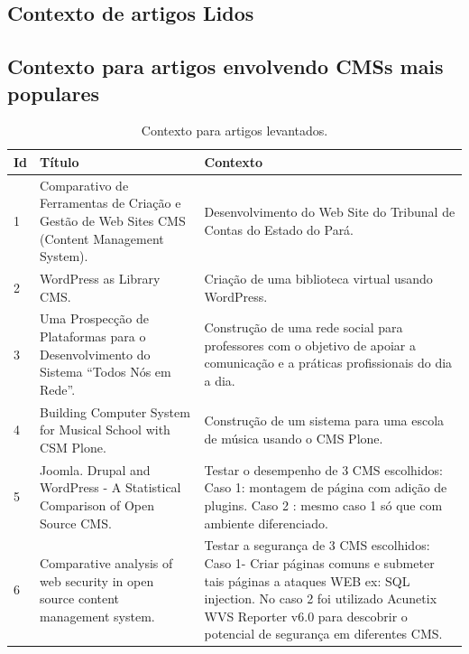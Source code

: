 \begin{apendicesenv}
\begin{landscape}
\section{Contexto de artigos Lidos}

\subsection{Contexto para artigos envolvendo CMSs mais populares}


	\begin{longtable}{|p{10pt}|p{320pt}|p{315pt}|}
 	\caption{Contexto para artigos levantados.} \label{tabela_contexto}\\
 	\hline
 	 {\raggedright \textbf{Id}}
 	 & {\raggedright \textbf{Título}}
 	 & {\raggedright \textbf{Contexto}}\\
 	\hline
 	 {\raggedright 1}
 	 & {\raggedright Comparativo de Ferramentas de Criação e Gestão de Web Sites CMS (Content Management System).}
 	 & {\raggedright Desenvolvimento do Web Site do Tribunal de Contas do Estado do Pará. \cite{costa}}\\
 	\hline
 	 {\raggedright 2}
 	 & {\raggedright WordPress as Library CMS.}
 	 & {\raggedright Criação de uma biblioteca virtual usando WordPress.\cite{jones_2011} }\\
 	\hline
 	 {\raggedright 3} 
 	 & {\raggedright Uma Prospecção de Plataformas para o Desenvolvimento do Sistema
 	 “Todos Nós em Rede”.}
& {\raggedright Construção de uma rede social para professores com o objetivo de apoiar a comunicação e a práticas profissionais do dia a dia. \cite{Reis}
}\\
 	\hline
 	 {\raggedright 4}
 	 & {\raggedright Building Computer System for Musical School
 	 with CSM Plone.}
 	 & {\raggedright Construção de um sistema para uma escola de música usando o CMS Plone.\cite{gadja}} \\
 	\hline
 	{\raggedright 5}
 	 & {\raggedright Joomla. Drupal and WordPress - A Statistical
 	 Comparison of Open Source CMS.}
 	 & {\raggedright Testar o desempenho de 3 CMS escolhidos: Caso 1: montagem de página com adição de plugins. Caso 2 : mesmo caso 1 só que com ambiente diferenciado.\cite{patel}} \\
 	\hline
 	{\raggedright 6}
 	 & {\raggedright Comparative analysis of web security in open source content management system.}
 	 & {\raggedright Testar a segurança de 3 CMS escolhidos: Caso 1- Criar páginas comuns e submeter tais páginas a ataques WEB ex: SQL injection. No caso 2 foi utilizado Acunetix WVS Reporter v6.0 para descobrir o potencial de segurança em diferentes CMS.\cite{Patel2013}} \\

\end{longtable}
\end{landscape}
\end{apendicesenv}
